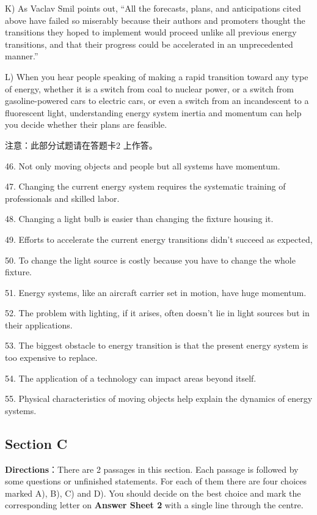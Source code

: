 \documentclass[UTF8,11pt]{ctexart}
\begin{document}
K) As Vaclav Smil points out, “All the forecasts, plans, and anticipations cited above have failed so miserably because their authors and promoters thought the transitions they hoped to implement would proceed unlike all previous energy transitions, and that their progress could be accelerated in an unprecedented manner.”


L) When you hear people speaking of making a rapid transition toward any type of energy, whether it is a switch from coal to nuclear power, or a switch from gasoline-powered cars to electric cars, or even a switch from an incandescent to a fluorescent light, understanding energy system inertia and momentum can help you decide whether their plans are feasible.


注意：此部分试题请在答题卡2 上作答。


46. Not only moving objects and people but all systems have momentum.


47. Changing the current energy system requires the systematic training of professionals and skilled labor.


48. Changing a light bulb is easier than changing the fixture housing it.


49. Efforts to accelerate the current energy transitions didn’t succeed as expected,


50. To change the light source is costly because you have to change the whole fixture.


51. Energy systems, like an aircraft carrier set in motion, have huge momentum.


52. The problem with lighting, if it arises, often doesn’t lie in light sources but in their applications.


53. The biggest obstacle to energy transition is that the present energy system is too expensive to replace.


54. The application of a technology can impact areas beyond itself.


55. Physical characteristics of moving objects help explain the dynamics of energy systems.


\subsection*{\textbf{Section C}}


\textbf{Directions}：There are 2 passages in this section. Each passage is followed by some questions or unfinished statements. For each of them there are four choices marked A), B), C) and D). You should decide on the best choice and mark the corresponding letter on\textbf{ Answer Sheet 2} with a single line through the centre.
\end{document}
